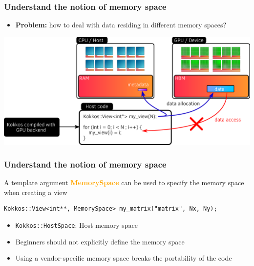 \documentclass[aspectratio=169]{beamer}
\newcommand{\highlight}[1]{\textcolor{orange}{\textbf{#1}}}
\begin{document}
\begin{frame}[fragile]
    \frametitle{Understand the notion of memory space}

\begin{itemize}
    \item \textbf{Problem:} how to deal with data residing in different memory spaces?
\end{itemize}

\begin{center}
    \includegraphics[width=\textwidth]{../../images/device_memory_access.png}
\end{center}

\end{frame}


\begin{frame}[fragile]
    \frametitle{Understand the notion of memory space}

A template argument \highlight{MemorySpace} can be used to specify the memory space when creating a view

\begin{verbatim}
Kokkos::View<int**, MemorySpace> my_matrix("matrix", Nx, Ny);
\end{verbatim}

\begin{itemize}
    \item \texttt{Kokkos::HostSpace}: Host memory space
\end{itemize}

\begin{alertblock}{}
    \begin{itemize}
    \item Beginners should not explicitly define the memory space
    \item Using a vendor-specific memory space breaks the portability of the code
    \end{itemize}
\end{alertblock}

\end{frame}
\end{document}
